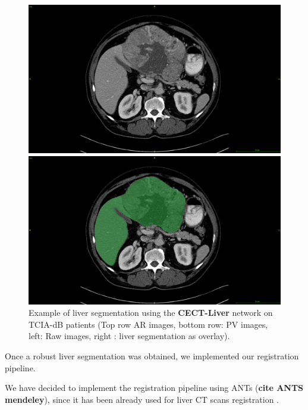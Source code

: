 \documentclass[]{article}
\newcommand{\pplfont}[1]{{\textbf{\fontfamily{ppl}\selectfont #1}}}
\newcommand{\lmttfont}[1]{{\fontfamily{lmtt}\selectfont #1}}
\begin{document}
\begin{figure}[ht!]
\vspace{0.8cm}
\begin{minipage}{0.45\linewidth}
\includegraphics[width=0.9\linewidth]{./images/TCIA_CECTLiver_prediction_TCGA-DD-A11A_slice42_raw}
\end{minipage}
\hspace{0.3cm}
\begin{minipage}{0.45\linewidth}
\includegraphics[width=0.9\linewidth]{./images/TCIA_CECTLiver_prediction_TCGA-DD-A11A_slice42_greenLiver}
\end{minipage}
\caption{Example of liver segmentation using the \pplfont{CECT-Liver} network on \lmttfont{TCIA-dB}
patients (Top row AR images, bottom row: PV images, left:
Raw images, right : liver segmentation as overlay).}
\label{fig:LiverPredTciaDb}
\end{figure}



Once a robust liver segmentation was obtained, we implemented our
registration pipeline.

We have decided to implement the registration pipeline using ANTs
(\textbf{cite ANTS mendeley}), since it has been already used for liver
CT scans registration \cite{Zhao2019,Zhao2020}.
\end{document}
